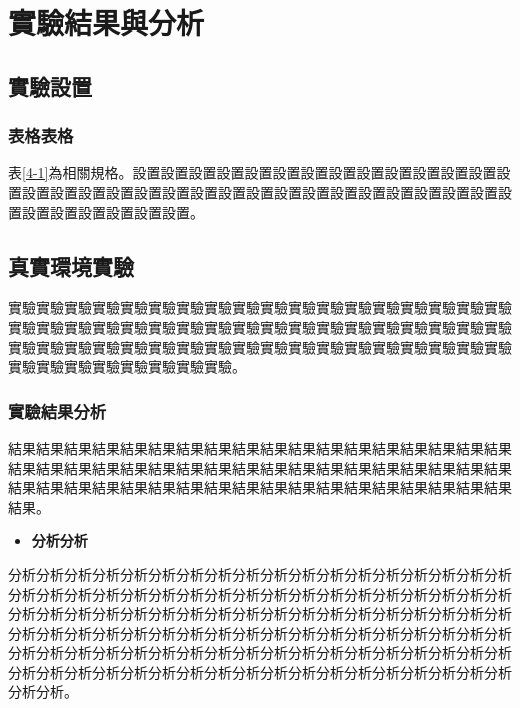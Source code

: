 \chapter{實驗結果與分析}
\label{c:implement}

\section{實驗設置}

\subsection{表格表格}
表\ref{4-1}為相關規格。設置設置設置設置設置設置設置設置設置設置設置設置設置設置設置設置設置設置設置設置設置設置設置設置設置設置設置設置設置設置設置設置設置設置設置設置設置設置。



\section{真實環境實驗}
實驗實驗實驗實驗實驗實驗實驗實驗實驗實驗實驗實驗實驗實驗實驗實驗實驗實驗實驗實驗實驗實驗實驗實驗實驗實驗實驗實驗實驗實驗實驗實驗實驗實驗實驗實驗實驗實驗實驗實驗實驗實驗實驗實驗實驗實驗實驗實驗實驗實驗實驗實驗實驗實驗實驗實驗實驗實驗實驗實驗實驗實驗。

\subsection{實驗結果分析}
結果結果結果結果結果結果結果結果結果結果結果結果結果結果結果結果結果結果結果結果結果結果結果結果結果結果結果結果結果結果結果結果結果結果結果結果結果結果結果結果結果結果結果結果結果結果結果結果結果結果結果結果結果結果結果。

\begin{itemize}
\item
\textbf{分析分析}
\end{itemize}

分析分析分析分析分析分析分析分析分析分析分析分析分析分析分析分析分析分析分析分析分析分析分析分析分析分析分析分析分析分析分析分析分析分析分析分析分析分析分析分析分析分析分析分析分析分析分析分析分析分析分析分析分析分析分析分析分析分析分析分析分析分析分析分析分析分析分析分析分析分析分析分析分析分析分析分析分析分析分析分析分析分析分析分析分析分析分析分析分析分析分析分析分析分析分析分析分析分析分析分析分析分析分析分析分析分析分析分析分析分析。

\newpage

\newpage

